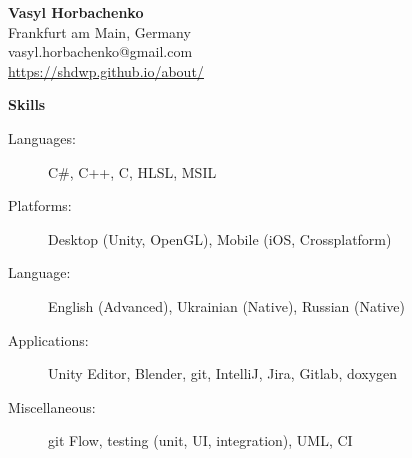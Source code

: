 \documentclass[letterpaper,11pt]{article}
\newcommand{\resheading}[1]{{\vspace{.2in} \large \colorbox{title_bg}{\begin{minipage}{\textwidth}{\textbf{#1 \vphantom{p\^{E}}}}\end{minipage}}}}
\begin{document}
\begin{minipage}{.70\linewidth}
	\begin{center}
		\textbf{\Large Vasyl Horbachenko} \\
		Frankfurt am Main, Germany \\
		vasyl.horbachenko@gmail.com \\
		\href{https://shdwp.github.io/about/}{\textcolor{link_fg}{\underline{https://shdwp.github.io/about/}}} \\

		\vspace{0.2in}
		\resheading{Skills}
		\begin{description}
			\item[Languages:]
				C\#, C++, C, HLSL, MSIL
			\item[Platforms:]
				Desktop (Unity, OpenGL), Mobile (iOS, Crossplatform)
		\end{description}
	\end{center}
\end{minipage}
\hfill
\begin{minipage}{.26\linewidth}
	\begin{flushright}
	\end{flushright}
\end{minipage}
\begin{description}
	\item[Language:]
		English (Advanced), Ukrainian (Native), Russian (Native)
	\item[Applications:]
		Unity Editor, Blender, git, IntelliJ, Jira, Gitlab, doxygen
	\item[Miscellaneous:]
		git Flow, testing (unit, UI, integration), UML, CI
\end{description}
\end{document}
